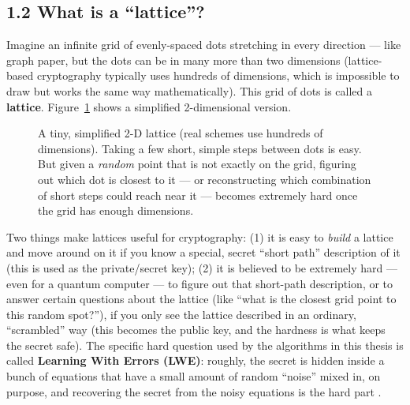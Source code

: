 \documentclass[11pt,a4paper]{article}
\begin{document}
\subsection*{1.2 What is a ``lattice''?}
Imagine an infinite grid of evenly-spaced dots stretching in every direction --- like graph paper, but the dots can be in many more than two dimensions (lattice-based cryptography typically uses hundreds of dimensions, which is impossible to draw but works the same way mathematically). This grid of dots is called a \textbf{lattice}. Figure~\ref{fig:lattice} shows a simplified 2-dimensional version.

\begin{figure}[h]
\centering
{}
\caption{A tiny, simplified 2-D lattice (real schemes use hundreds of dimensions). Taking a few short, simple steps between dots is easy. But given a \emph{random} point that is not exactly on the grid, figuring out which dot is closest to it --- or reconstructing which combination of short steps could reach near it --- becomes extremely hard once the grid has enough dimensions.}
\label{fig:lattice}
\end{figure}

Two things make lattices useful for cryptography: (1) it is easy to \emph{build} a lattice and move around on it if you know a special, secret ``short path'' description of it (this is used as the private/secret key); (2) it is believed to be extremely hard --- even for a quantum computer --- to figure out that short-path description, or to answer certain questions about the lattice (like ``what is the closest grid point to this random spot?''), if you only see the lattice described in an ordinary, ``scrambled'' way (this becomes the public key, and the hardness is what keeps the secret safe). The specific hard question used by the algorithms in this thesis is called \textbf{Learning With Errors (LWE)}: roughly, the secret is hidden inside a bunch of equations that have a small amount of random ``noise'' mixed in, on purpose, and recovering the secret from the noisy equations is the hard part \cite{menezes2026gentle}.
\end{document}
